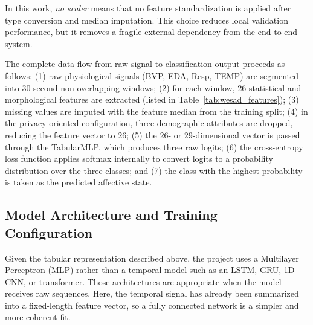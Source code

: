 \documentclass[12pt]{article}
\begin{document}
\begin{table}[htbp]
\centering
\caption{Comparison between the scaled local-reference pipeline and the selected no-scaler integration pipeline.}
\label{tab:preprocessing_contracts}
\end{table}

In this work, \textit{no scaler} means that no feature standardization is applied after type conversion and median imputation. This choice reduces local validation performance, but it removes a fragile external dependency from the end-to-end system.

The complete data flow from raw signal to classification output proceeds as follows: (1) raw physiological signals (BVP, EDA, Resp, TEMP) are segmented into 30-second non-overlapping windows; (2) for each window, 26 statistical and morphological features are extracted (listed in Table~\ref{tab:wesad_features}); (3) missing values are imputed with the feature median from the training split; (4) in the privacy-oriented configuration, three demographic attributes are dropped, reducing the feature vector to 26; (5) the 26- or 29-dimensional vector is passed through the TabularMLP, which produces three raw logits; (6) the cross-entropy loss function applies softmax internally to convert logits to a probability distribution over the three classes; and (7) the class with the highest probability is taken as the predicted affective state.

\subsection{Model Architecture and Training Configuration}

Given the tabular representation described above, the project uses a Multilayer Perceptron (MLP) rather than a temporal model such as an LSTM, GRU, 1D-CNN, or transformer. Those architectures are appropriate when the model receives raw sequences. Here, the temporal signal has already been summarized into a fixed-length feature vector, so a fully connected network is a simpler and more coherent fit.
\end{document}

